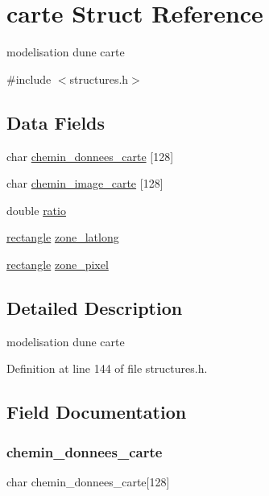 \hypertarget{structcarte}{}\section{carte Struct Reference}
\label{structcarte}


modelisation d\textquotesingle{}une carte  




{\ttfamily \#include $<$structures.\+h$>$}

\subsection*{Data Fields}
\begin{DoxyCompactItemize}
\item 
char \hyperlink{structcarte_aac690e5d54248ece98a26eb60fd0c179}{chemin\+\_\+donnees\+\_\+carte} \mbox{[}128\mbox{]}
\item 
char \hyperlink{structcarte_a14ecc94c2719b58bbfd7b6249ff3ad4b}{chemin\+\_\+image\+\_\+carte} \mbox{[}128\mbox{]}
\item 
double \hyperlink{structcarte_aa422b0077d0c570937a73aa5b8eb4440}{ratio}
\item 
\hyperlink{structrectangle}{rectangle} \hyperlink{structcarte_ad42edc35194368fcf17c221930cbabe0}{zone\+\_\+latlong}
\item 
\hyperlink{structrectangle}{rectangle} \hyperlink{structcarte_addf5558f9faa154e716d68678b042f98}{zone\+\_\+pixel}
\end{DoxyCompactItemize}


\subsection{Detailed Description}
modelisation d\textquotesingle{}une carte 

Definition at line 144 of file structures.\+h.



\subsection{Field Documentation}
\hypertarget{structcarte_aac690e5d54248ece98a26eb60fd0c179}{}\label{structcarte_aac690e5d54248ece98a26eb60fd0c179} 
\subsubsection{\texorpdfstring{chemin\+\_\+donnees\+\_\+carte}{chemin\_donnees\_carte}}
{\footnotesize\ttfamily char chemin\+\_\+donnees\+\_\+carte\mbox{[}128\mbox{]}}




